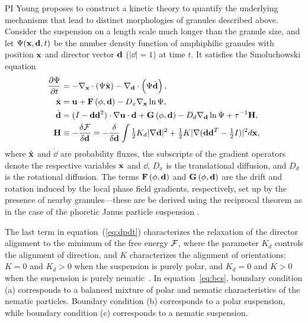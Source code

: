 %
PI Young proposes to construct a kinetic theory to quantify the underlying 
mechanisms that lead to distinct morphologies of granules described above.
Consider the suspension on a length scale much longer than the granule size, 
and let $\Psi({\bf x}, {\bf d},t)$ be the number density
function of amphiphilic granules with position ${\bf x}$
and director vector ${\bf d}$ ($|\dd|=1$) at time $t$.
It satisfies the Smoluchowski equation 
\begin{align}
  \frac{\partial \Psi}{\partial t} &= -\nabla_{\bf x} \cdot\left(\Psi\dot{\bf x}\right)
  - \nabla_{\bf d}\cdot\left(\Psi \dot{\bf d}\right),\\
\dot{\bf x} &= {\bf u} + {\bf F}\left(\phi,{\bf d}\right) - D_x\nabla_{\bf x}\ln\Psi,\\
\label{eq:dpdt}
\dot{\bf d} &= (I-{\bf d}{\bf d}^2)\cdot\nabla {\bf u}\cdot {\bf d} + {\bf G}\left(\phi,{\bf d}\right) - D_d \nabla_{\bf d}\ln \Psi + \tau^{-1}{\bf H},\\
    {\bf H} &\equiv -\frac{\delta {\cal F}}{\delta {\bf d}}
    = -\frac{\delta}{\delta {\bf d}} 
    \int 
    \tfrac{1}{2}K_d |\nabla{\bf d}|^2 + \tfrac{1}{2}K|\nabla({\bf d}{\bf d}^T- \tfrac{1}{2}I)|^2 d{\bf x},
\end{align}
where $\dot{\mathbf{x}}$ and $\dot\dd$ are probability fluxes,
the subscripts of the gradient operators denote
the respective variables $\mathbf{x}$ and $\dd$,
$D_x$ is the translational diffusion,
and $D_d$ is the rotational diffusion.
The terms ${\bf F}\left(\phi,{\bf d}\right)$ and
${\bf G}\left(\phi,{\bf d}\right)$ are the drift and rotation
induced by the local phase field gradients, respectively,
set up by the presence of nearby granules---these
are be derived using
the reciprocal theorem as in the case of the phoretic Janus particle
suspension \cite{TraversoMichellin2020_PRF,TraversoMichellin2022_JFM}.

The last term in equation~(\ref{eq:dpdt}) characterizes the relaxation
of the director alignment to the minimum of the free energy ${\cal F}$,
where the parameter $K_d$ controls the alignment of direction, and $K$
characterizes the alignment of orientations: $K=0$ and $K_d > 0$ when
the suspension is purely polar, and $K_d=0$ and $K>0$ when the
suspension is purely nematic~\cite{Amiri2022_JPhysA}. 
%
In equation~\eqref{eq:bcs}, boundary condition (a) corresponds to a
balanced mixture of polar and nematic characteristics of the nematic
particles. Boundary condition (b) corresponds to a polar suspension,
while boundary condition (c) corresponds to a nematic suspension. 

